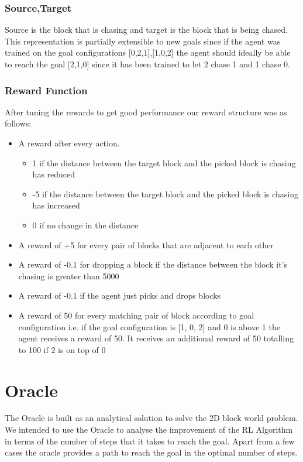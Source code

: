 \documentclass[letterpaper, 12 pt, conference]{ieeeconf}
\begin{document}
\subsubsection{Source,Target} Source is the block that is chasing and target is the block that is being chased.
This representation is partially extensible to new goals since if the agent was trained on the goal configurations [0,2,1],[1,0,2] the agent should ideally be able to reach the goal [2,1,0] since it has been trained to let 2 chase 1 and 1 chase 0.

\subsubsection{Reward Function} After tuning the rewards to get good performance our reward structure was as follows:

\begin{itemize}
    \item A reward after every action.
    \begin{itemize}
        \item 1 if the distance between the target block and the picked block is chasing has reduced
        \item -5 if the distance between the target block and the picked block is chasing has increased
        \item 0 if no change in the distance
    \end{itemize}
    \item A reward of +5 for every pair of blocks that are adjacent to each other
     \item A reward of -0.1 for dropping a block if the distance between the block it’s chasing is greater than 5000
    \item A reward of -0.1 if the agent just picks and drops blocks
    \item A reward of 50 for every matching pair of block according to goal configuration
i.e. if the goal configuration is [1, 0, 2] and 0 is above 1 the agent receives a reward of 50. It receives an additional reward of 50  totalling to 100 if 2 is on top of 0
\end{itemize}

\section{Oracle}
The Oracle is built as an analytical solution to solve the 2D block world problem. We intended to use the Oracle to analyse the improvement of the RL Algorithm in terms of the number of steps that it takes to reach the goal. Apart from a few cases the oracle provides a path to reach the goal in the optimal number of steps.
\end{document}
